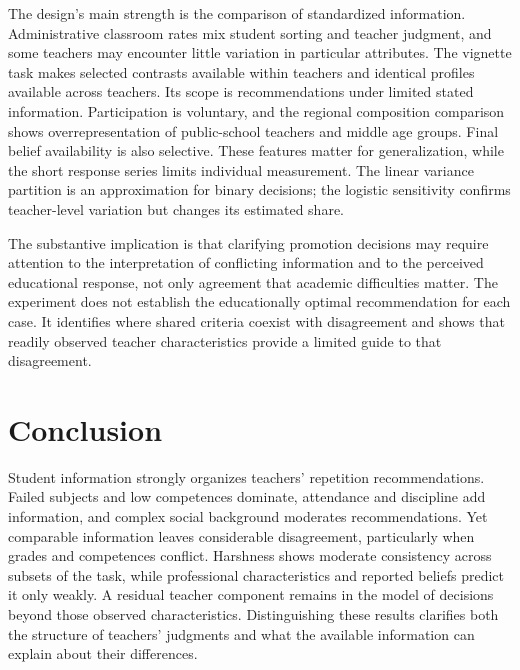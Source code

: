 The design's main strength is the comparison of standardized information. Administrative classroom rates mix student sorting and teacher judgment, and some teachers may encounter little variation in particular attributes. The vignette task makes selected contrasts available within teachers and identical profiles available across teachers. Its scope is recommendations under limited stated information. Participation is voluntary, and the regional composition comparison shows overrepresentation of public-school teachers and middle age groups. Final belief availability is also selective. These features matter for generalization, while the short response series limits individual measurement. The linear variance partition is an approximation for binary decisions; the logistic sensitivity confirms teacher-level variation but changes its estimated share.

The substantive implication is that clarifying promotion decisions may require attention to the interpretation of conflicting information and to the perceived educational response, not only agreement that academic difficulties matter. The experiment does not establish the educationally optimal recommendation for each case. It identifies where shared criteria coexist with disagreement and shows that readily observed teacher characteristics provide a limited guide to that disagreement.

\section{Conclusion}
Student information strongly organizes teachers' repetition recommendations. Failed subjects and low competences dominate, attendance and discipline add information, and complex social background moderates recommendations. Yet comparable information leaves considerable disagreement, particularly when grades and competences conflict. Harshness shows moderate consistency across subsets of the task, while professional characteristics and reported beliefs predict it only weakly. A residual teacher component remains in the model of decisions beyond those observed characteristics. Distinguishing these results clarifies both the structure of teachers' judgments and what the available information can explain about their differences.

\clearpage\color{black}
\clearpage\appendix{}\color{revised}
